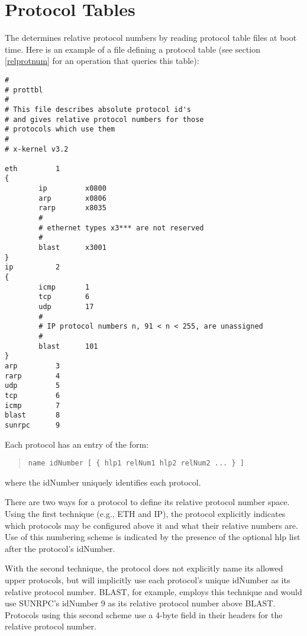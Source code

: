 % 
%
%

\section{Protocol Tables}
\label{protnum}

The \xk{} determines relative protocol numbers by reading protocol
table files at boot time.  Here is an example of a file defining a
protocol table (see section \ref{relprotnum} for an operation that
queries this table):

\begin{verbatim}
#
# prottbl
#
# This file describes absolute protocol id's 
# and gives relative protocol numbers for those
# protocols which use them
#
# x-kernel v3.2

eth         1    
{
        ip         x0800
        arp        x0806
        rarp       x8035
        #
        # ethernet types x3*** are not reserved
        #
        blast      x3001
}
ip          2
{
        icmp       1
        tcp        6
        udp        17
        #
        # IP protocol numbers n, 91 < n < 255, are unassigned
        #
        blast      101
}
arp         3
rarp        4
udp         5
tcp         6
icmp        7
blast       8
sunrpc      9

\end{verbatim}

\noindent Each protocol has an entry of the form:

\medskip

\begin{quote}
{\tt name   idNumber    [ \{  hlp1  relNum1  hlp2 relNum2  ... \} ] }
\end{quote}

\medskip

\noindent where the idNumber uniquely identifies each protocol.

There are two ways for a protocol to define its relative protocol
number space.  Using the first technique (e.g., ETH and IP), the
protocol explicitly indicates which protocols may be configured above
it and what their relative numbers are.  Use of this numbering scheme
is indicated by the presence of the optional hlp list after the
protocol's idNumber.

With the second technique, the protocol does not explicitly name its
allowed upper protocols, but will implicitly use each protocol's
unique idNumber as its relative protocol number.  BLAST, for example,
employs this technique and would use SUNRPC's idNumber 9 as its
relative protocol number above BLAST.  Protocols using this second
scheme use a 4-byte field in their headers for the relative protocol
number.

